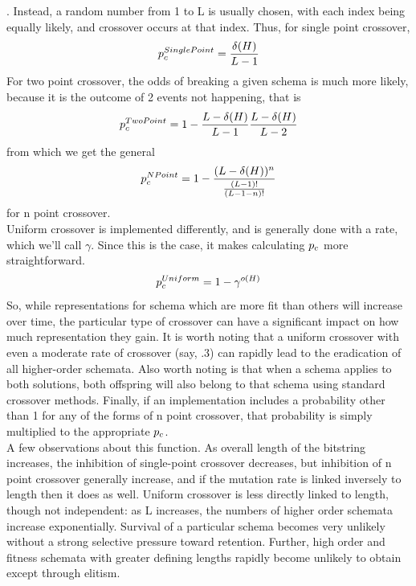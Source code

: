.  Instead, a random number from 1 to L is usually chosen, with each index being equally likely, and crossover occurs at that index. Thus, for single point crossover, $$p_c^{SinglePoint} = \frac{\delta(H)}{L-1} $$ For two point crossover, the odds of breaking a given schema is much more likely, because it is the outcome of 2 events not happening, that is $$p_c^{TwoPoint} = 1-\frac{L-\delta(H)}{L-1} \frac{L-\delta(H)}{L-2} $$ from which we get the general $$p_c^{NPoint} = 1- \frac{(L-\delta(H))^n}{\frac{(L-1)!}{(L-1-n)!}} $$
for n point crossover. \\Uniform crossover is implemented differently, and is generally done with a rate, which we'll call $\gamma$.  Since this is the case, it makes calculating $p_c$ more straightforward.  
$$p_c^{Uniform} = 1 - \gamma^{o(H)} $$So, while representations for schema which are more fit than others will increase over time, the particular type of crossover can have a significant impact on how much representation they gain.  It is worth noting that a uniform crossover with even a moderate rate of crossover (say, .3) can rapidly lead to the eradication of all higher-order schemata.  Also worth noting is that when a schema applies to both solutions, both offspring will also belong to that schema using standard crossover methods.  Finally, if an implementation includes a probability other than 1 for any of the forms of n point crossover, that probability is simply multiplied to the appropriate $p_c$.\\
A few observations about this function.  As overall length of the bitstring increases, the inhibition of single-point crossover decreases, but inhibition of n point crossover generally increase, and if the mutation rate is linked inversely to length then it does as well.  Uniform crossover is less directly linked to length, though not independent: as L increases, the numbers of higher order schemata increase exponentially.  Survival of a particular schema becomes very unlikely without a strong selective pressure toward retention. Further, high order and fitness schemata with greater defining lengths rapidly become unlikely to obtain except through elitism.  
\\
